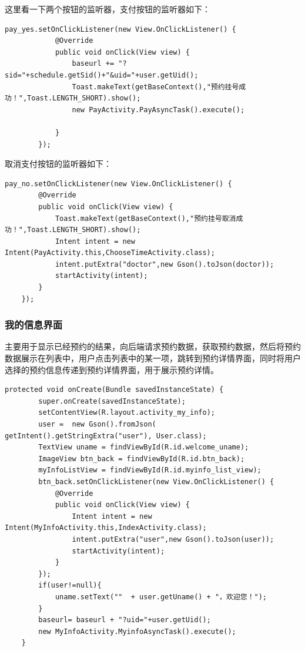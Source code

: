 \documentclass[UTF8,12pt]{article}
\begin{document}
这里看一下两个按钮的监听器，支付按钮的监听器如下：

\begin{lstlisting}[frame=shadowbox]
    pay_yes.setOnClickListener(new View.OnClickListener() {
            @Override
            public void onClick(View view) {
                baseurl += "?sid="+schedule.getSid()+"&uid="+user.getUid();
                Toast.makeText(getBaseContext(),"预约挂号成功！",Toast.LENGTH_SHORT).show();
                new PayActivity.PayAsyncTask().execute();

            }
        });
\end{lstlisting}

取消支付按钮的监听器如下：

\begin{lstlisting}[frame=shadowbox]
    pay_no.setOnClickListener(new View.OnClickListener() {
        @Override
        public void onClick(View view) {
            Toast.makeText(getBaseContext(),"预约挂号取消成功！",Toast.LENGTH_SHORT).show();
            Intent intent = new Intent(PayActivity.this,ChooseTimeActivity.class);
            intent.putExtra("doctor",new Gson().toJson(doctor));
            startActivity(intent);
        }
    });
\end{lstlisting}

\subsubsection{我的信息界面}
主要用于显示已经预约的结果，向后端请求预约数据，获取预约数据，然后将预约数据展示在列表中，用户点击列表中的某一项，跳转到预约详情界面，同时将用户选择的预约信息传递到预约详情界面，用于展示预约详情。

\begin{lstlisting}[frame=shadowbox]
    protected void onCreate(Bundle savedInstanceState) {
        super.onCreate(savedInstanceState);
        setContentView(R.layout.activity_my_info);
        user =  new Gson().fromJson( getIntent().getStringExtra("user"), User.class);
        TextView uname = findViewById(R.id.welcome_uname);
        ImageView btn_back = findViewById(R.id.btn_back);
        myInfoListView = findViewById(R.id.myinfo_list_view);
        btn_back.setOnClickListener(new View.OnClickListener() {
            @Override
            public void onClick(View view) {
                Intent intent = new Intent(MyInfoActivity.this,IndexActivity.class);
                intent.putExtra("user",new Gson().toJson(user));
                startActivity(intent);
            }
        });
        if(user!=null){
            uname.setText(""  + user.getUname() + "，欢迎您！");
        }
        baseurl= baseurl + "?uid="+user.getUid();
        new MyInfoActivity.MyinfoAsyncTask().execute();
    }
\end{lstlisting}
\end{document}
